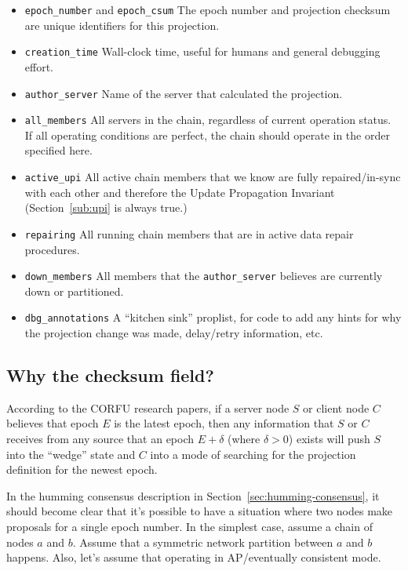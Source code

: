 \documentclass[preprint,10pt]{sigplanconf}
\begin{document}
\begin{itemize}
\item {\tt epoch\_number} and {\tt epoch\_csum} The epoch number and
  projection checksum are unique identifiers for this projection.
\item {\tt creation\_time} Wall-clock time, useful for humans and
  general debugging effort.
\item {\tt author\_server} Name of the server that calculated the projection.
\item {\tt all\_members} All servers in the chain, regardless of current
  operation status.  If all operating conditions are perfect, the
  chain should operate in the order specified here.
\item {\tt active\_upi} All active chain members that we know are
  fully repaired/in-sync with each other and therefore the Update
  Propagation Invariant (Section~\ref{sub:upi} is always true.)
\item {\tt repairing} All running chain members that
  are in active data repair procedures.
\item {\tt down\_members} All members that the {\tt author\_server}
  believes are currently down or partitioned.
\item {\tt dbg\_annotations} A ``kitchen sink'' proplist, for code to
  add any hints for why the projection change was made, delay/retry
  information, etc.
\end{itemize}

\subsection{Why the checksum field?}

According to the CORFU research papers, if a server node $S$ or client
node $C$ believes that epoch $E$ is the latest epoch, then any information
that $S$ or $C$ receives from any source that an epoch $E+\delta$ (where
$\delta > 0$) exists will push $S$ into the ``wedge'' state and $C$ into a mode
of searching for the projection definition for the newest epoch.

In the humming consensus description in
Section~\ref{sec:humming-consensus}, it should become clear that it's
possible to have a situation where two nodes make proposals
for a single epoch number.  In the simplest case, assume a chain of
nodes $a$ and $b$.  Assume that a symmetric network partition between
$a$ and $b$ happens. Also, let's assume that operating in
AP/eventually consistent mode.
\end{document}
